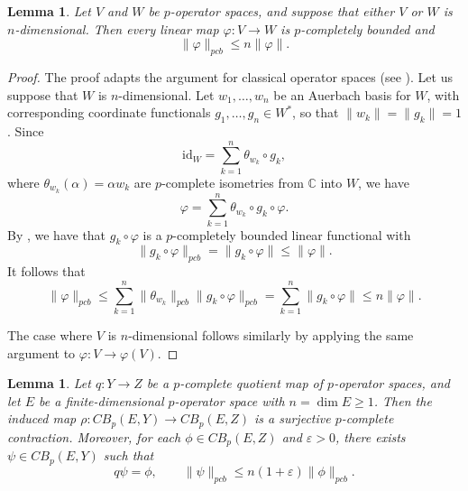 \documentclass[12pt]{article}
\newtheorem{lemma}[theorem]{Lemma}
\newcommand{\pcb}{pcb}
\newcommand{\CBp}{CB_p}
\begin{document}
\begin{lemma}\label{lem:finite-cb-comparison}
Let $V$ and $W$ be $p$-operator spaces, and suppose that either $V$ or $W$ is
$n$-dimensional.  Then every linear map $\varphi:V\to W$ is $p$-completely
bounded and
\[
        \|\varphi\|_{\pcb}\leq n\|\varphi\|.
\]
\end{lemma}

\begin{proof}
The proof adapts the argument for classical operator spaces (see \cite[Corollary 2.2.4]{ER00}).
Let us suppose that $W$ is $n$-dimensional. Let $w_1,\ldots,w_n$ be an Auerbach
basis for $W$, with corresponding coordinate functionals $g_1,\ldots,g_n \in W^*$, so that
$\|w_k\|=\|g_k\|=1$. Since
\[
        \mathrm{id}_W = \sum_{k=1}^n \theta_{w_k} \circ g_k,
\]
where $\theta_{w_k}(\alpha) = \alpha w_k$ are $p$-complete isometries from $\mathbb{C}$ into $W$, we have
\[
        \varphi = \sum_{k=1}^n \theta_{w_k} \circ g_k \circ \varphi.
\]
By \cite[Lemma 4.2]{Daws2007}, we have that $g_k \circ \varphi$ is a $p$-completely bounded linear functional with
\[
        \|g_k \circ \varphi\|_{\pcb} = \|g_k \circ \varphi\| \leq \|\varphi\|.
\]
It follows that
\[
        \|\varphi\|_{\pcb} \leq \sum_{k=1}^n \|\theta_{w_k}\|_{\pcb}\|g_k \circ \varphi\|_{\pcb} = \sum_{k=1}^n \|g_k \circ \varphi\| \leq n\|\varphi\|.
\]

The case where $V$ is $n$-dimensional follows similarly by applying the same argument to $\varphi:V\to\varphi(V)$.
\end{proof}

\begin{lemma}\label{lem:correction}
Let $q:Y\to Z$ be a $p$-complete quotient map of $p$-operator spaces, and let
$E$ be a finite-dimensional $p$-operator space with $n=\dim E\geq 1$.  Then
the induced map $\rho:\CBp(E,Y)\longrightarrow \CBp(E,Z)$ is a surjective
$p$-complete contraction.
Moreover, for each $\phi\in \CBp(E,Z)$ and $\varepsilon>0$, there exists $\psi\in\CBp(E,Y)$ such that
\[
        q\psi=\phi,\qquad \|\psi\|_{\pcb}\leq n(1+\varepsilon)\|\phi\|_{\pcb}.
\]
\end{lemma}
\end{document}
